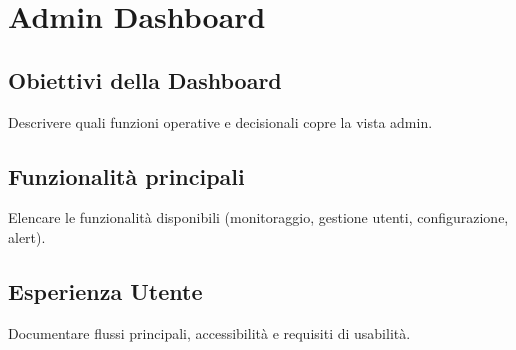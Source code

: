 \chapter{Admin Dashboard}

\section{Obiettivi della Dashboard}
Descrivere quali funzioni operative e decisionali copre la vista admin.

\section{Funzionalità principali}
Elencare le funzionalità disponibili (monitoraggio, gestione utenti, configurazione, alert).

\section{Esperienza Utente}
Documentare flussi principali, accessibilità e requisiti di usabilità.
